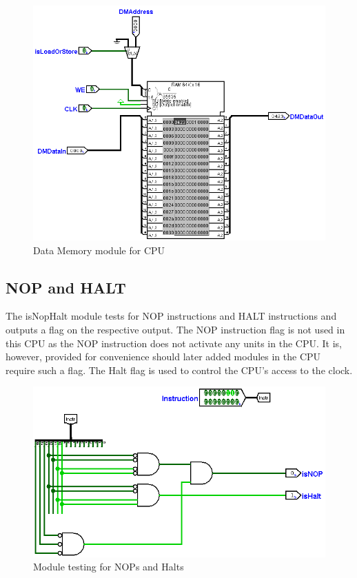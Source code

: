 \documentclass[12pt, letter]{article}
\begin{document}
	\begin{figure}[h]
		\centering
		\includegraphics[scale = 0.25]{DataMemory}
		\caption{Data Memory module for CPU}
		\label{fig:DataMemory}
	\end{figure}

	\subsection{NOP and HALT} 
	The isNopHalt module tests for NOP instructions and HALT instructions and outputs a flag on the respective output. The NOP instruction flag is not used in this CPU as the NOP instruction does not activate any units in the CPU. It is, however, provided for convenience should later added modules in the CPU require such a flag. The Halt flag is used to control the CPU's access to the clock.
	
	\begin{figure}[h]
		\centering
		\includegraphics[scale = 0.3]{isNopHalt}
		\caption{Module testing for NOPs and Halts}
		\label{fig:isNopHalt}
	\end{figure}
	\newpage
\end{document}

